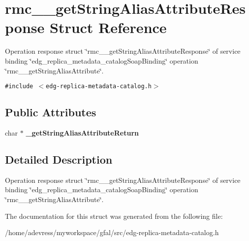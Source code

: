 \section{rmc\_\-\_\-get\-String\-Alias\-Attribute\-Response Struct Reference}
\label{structrmc____getStringAliasAttributeResponse}
Operation response struct \char`\"{}rmc\_\-\_\-get\-String\-Alias\-Attribute\-Response\char`\"{} of service binding \char`\"{}edg\_\-replica\_\-metadata\_\-catalog\-Soap\-Binding\char`\"{} operation \char`\"{}rmc\_\-\_\-get\-String\-Alias\-Attribute\char`\"{}.  


{\tt \#include $<$edg-replica-metadata-catalog.h$>$}

\subsection*{Public Attributes}
\begin{CompactItemize}
\item 
char $\ast$ \textbf{\_\-get\-String\-Alias\-Attribute\-Return}\label{structrmc____getStringAliasAttributeResponse_c843a0d9d7bc38b3a66a975e153b1c22}

\end{CompactItemize}


\subsection{Detailed Description}
Operation response struct \char`\"{}rmc\_\-\_\-get\-String\-Alias\-Attribute\-Response\char`\"{} of service binding \char`\"{}edg\_\-replica\_\-metadata\_\-catalog\-Soap\-Binding\char`\"{} operation \char`\"{}rmc\_\-\_\-get\-String\-Alias\-Attribute\char`\"{}. 



The documentation for this struct was generated from the following file:\begin{CompactItemize}
\item 
/home/adevress/myworkspace/gfal/src/edg-replica-metadata-catalog.h\end{CompactItemize}
